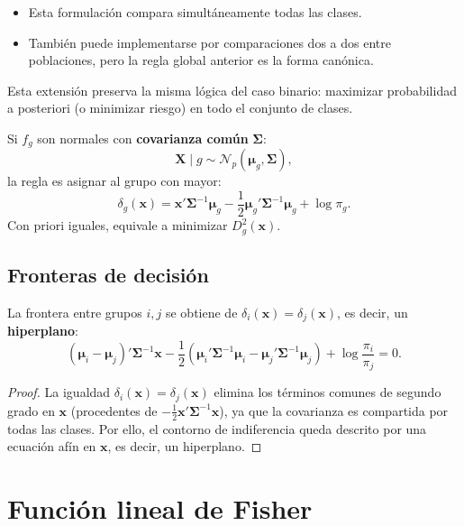 \documentclass[12pt, a4paper]{article}
\theoremstyle{plain}
\theoremstyle{definition}
\theoremstyle{remark}
\begin{document}
\begin{itemize}
  \item Esta formulación compara simultáneamente todas las clases.
  \item También puede implementarse por comparaciones dos a dos entre
        poblaciones, pero la regla global anterior es la forma canónica.
\end{itemize}

Esta extensión preserva la misma lógica del caso binario: maximizar
probabilidad a posteriori (o minimizar riesgo) en todo el conjunto de clases.

Si $f_g$ son normales con \textbf{covarianza común} $\boldsymbol{\Sigma}$:
\[
  \mathbf{X}\mid g\sim\mathcal{N}_p(\boldsymbol{\mu}_g,\boldsymbol{\Sigma}),
\]
la regla es asignar al grupo con mayor:
\[
  \delta_g(\mathbf{x})=
  \mathbf{x}'\boldsymbol{\Sigma}^{-1}\boldsymbol{\mu}_g
  -\frac12\boldsymbol{\mu}_g'\boldsymbol{\Sigma}^{-1}\boldsymbol{\mu}_g
  +\log\pi_g.
\]
Con priori iguales, equivale a minimizar $D_g^2(\mathbf{x})$.

\subsection{Fronteras de decisión}

La frontera entre grupos $i,j$ se obtiene de
$\delta_i(\mathbf{x})=\delta_j(\mathbf{x})$, es decir, un \textbf{hiperplano}:
\[
  (\boldsymbol{\mu}_i-\boldsymbol{\mu}_j)'\boldsymbol{\Sigma}^{-1}\mathbf{x}
  -\frac12
  \left(
    \boldsymbol{\mu}_i'\boldsymbol{\Sigma}^{-1}\boldsymbol{\mu}_i
    -\boldsymbol{\mu}_j'\boldsymbol{\Sigma}^{-1}\boldsymbol{\mu}_j
  \right)
  +\log\!\frac{\pi_i}{\pi_j}=0.
\]

\begin{proof}
La igualdad $\delta_i(\mathbf{x})=\delta_j(\mathbf{x})$ elimina los términos
comunes de segundo grado en $\mathbf{x}$ (procedentes de
$-\tfrac12\mathbf{x}'\boldsymbol{\Sigma}^{-1}\mathbf{x}$), ya que la
covarianza es compartida por todas las clases. Por ello, el contorno de
indiferencia queda descrito por una ecuación afín en $\mathbf{x}$, es decir,
un hiperplano.
\end{proof}

\section{Función lineal de Fisher}
\end{document}
